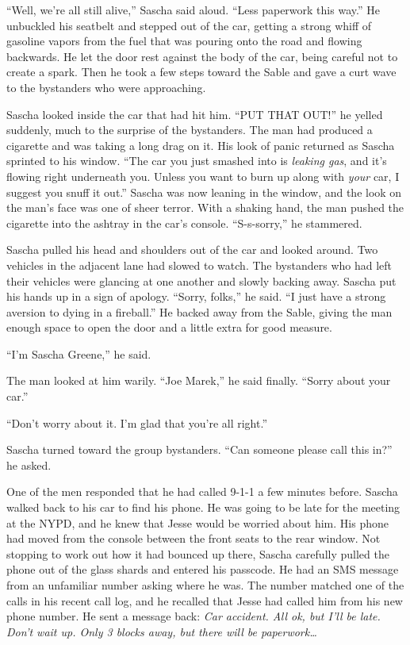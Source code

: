 \documentclass[12pt]{book}
\begin{document}
``Well, we're all still alive,'' Sascha said aloud.  ``Less paperwork this way.''  He unbuckled his seatbelt and stepped out of the car, getting a strong whiff of gasoline vapors from the fuel that was pouring onto the road and flowing backwards.  He let the door rest against the body of the car, being careful not to create a spark.  Then he took a few steps toward the Sable and gave a curt wave to the bystanders who were approaching.

Sascha looked inside the car that had hit him.  ``PUT THAT OUT!'' he yelled suddenly, much to the surprise of the bystanders.  The man had produced a cigarette and was taking a long drag on it.  His look of panic returned as Sascha sprinted to his window.  ``The car you just smashed into is \emph{leaking gas}, and it's flowing right underneath you.  Unless you want to burn up along with \emph{your} car, I suggest you snuff it out.''  Sascha was now leaning in the window, and the look on the man's face was one of sheer terror.  With a shaking hand, the man pushed the cigarette into the ashtray in the car's console.  ``S-s-sorry,'' he stammered.

Sascha pulled his head and shoulders out of the car and looked around.  Two vehicles in the adjacent lane had slowed to watch.  The bystanders who had left their vehicles were glancing at one another and slowly backing away.  Sascha put his hands up in a sign of apology.  ``Sorry, folks,'' he said.  ``I just have a strong aversion to dying in a fireball.''  He backed away from the Sable, giving the man enough space to open the door and a little extra for good measure.

``I'm Sascha Greene,'' he said.

The man looked at him warily.  ``Joe Marek,'' he said finally.  ``Sorry about your car.''

``Don't worry about it.  I'm glad that you're all right.''

Sascha turned toward the group bystanders.  ``Can someone please call this in?'' he asked.

One of the men responded that he had called 9-1-1 a few minutes before.  Sascha walked back to his car to find his phone.  He was going to be late for the meeting at the NYPD, and he knew that Jesse would be worried about him.  His phone had moved from the console between the front seats to the rear window.  Not stopping to work out how it had bounced up there, Sascha carefully pulled the phone out of the glass shards and entered his passcode.  He had an SMS message from an unfamiliar number asking where he was.  The number matched one of the calls in his recent call log, and he recalled that Jesse had called him from his new phone number.  He sent a message back: \emph{Car accident. All ok, but I'll be late. Don't wait up. Only 3 blocks away, but there will be paperwork\dots}
\end{document}
